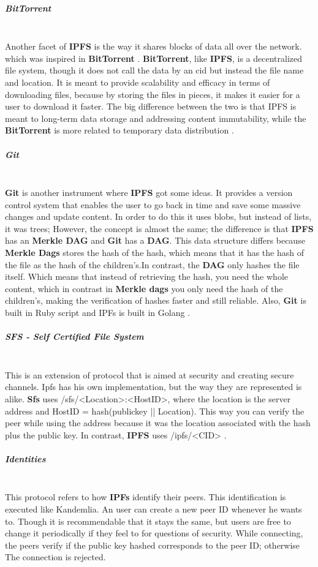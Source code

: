 \subparagraph{BitTorrent}\mbox{}\\
Another facet of \textbf{IPFS} is the way it shares blocks of data all over the network.
which was inspired in \textbf{BitTorrent} . \textbf{BitTorrent}, like \textbf{IPFS}, is a decentralized file system, though it does not call the data by an cid but instead the file name and
location. It is meant to provide scalability and efficacy in terms of downloading
files, because by storing the files in pieces, it makes it easier for a user to download
it faster. The big difference between the two is that IPFS is meant to long-term data storage and addressing content immutability, while the \textbf{BitTorrent} is more related to temporary data distribution \cite{bittorrent}.

\subparagraph{Git}\mbox{}\\
\textbf{Git} is another instrument where \textbf{IPFS} got some ideas. It provides a version control system that enables the user to go back in time and save some massive changes and update content. In order to do this it uses blobs, but instead of lists, it was trees; However, the concept is almost the same; the difference is that \textbf{IPFS} has an \textbf{Merkle DAG} and \textbf{Git} has a \textbf{DAG}. This data structure differs because \textbf{Merkle Dags} stores the hash of the hash, which means that it has the hash of the file as the hash of the children's.In contrast, the \textbf{DAG} only hashes the file itself. Which means that instead of retrieving the hash, you need the whole content, which in contrast in \textbf{Merkle dags} \cite{merkle-dag} you only need the hash of the children's, making the verification of hashes faster and still reliable. Also, \textbf{Git} is built in Ruby script and IPFs is built in Golang \cite{git}.

\subparagraph{SFS - Self Certified File System}\mbox{}\\
This is an extension of protocol that is aimed at security and creating secure channels. Ipfs has his own implementation, but the way they are represented is alike.
\textbf{Sfs} uses /sfs/<Location>:<HostID>, where the location is the server address and HostID = hash(publickey || Location). This way you can verify the peer while using the address because it was the location associated with the hash
plus the public key. In contrast, \textbf{IPFS} uses /ipfs/<CID> \cite{SFS}.

\subparagraph{Identities}  \mbox{} \\
This protocol refers to how \textbf{IPFs} identify their peers. This identification is executed like Kandemlia. An user can create a new peer ID whenever he wants to. Though it is recommendable that it stays the same, but users are free to
change it periodically if they feel to for questions of security. While connecting, the peers verify if the public key hashed corresponds to the peer ID; otherwise
The connection is rejected.

